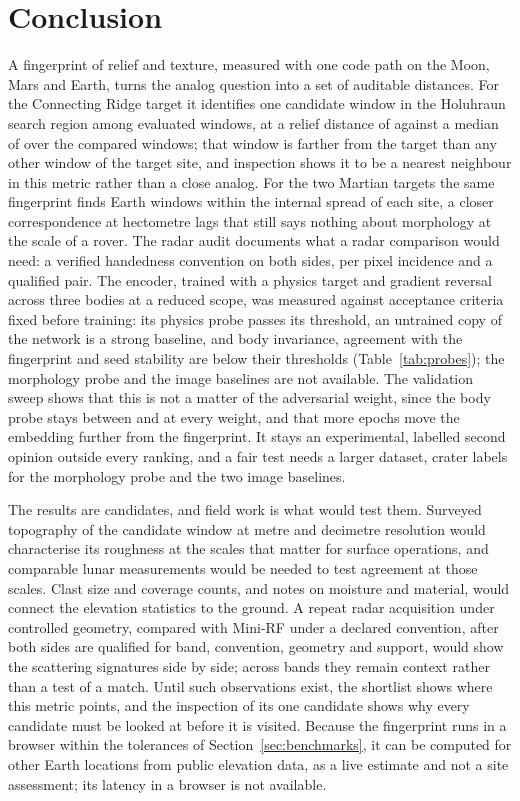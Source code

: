 \section{Conclusion}
\label{sec:conclusion}

A fingerprint of relief and texture, measured with one code path on the Moon, Mars and Earth, turns
the analog question into a set of auditable distances. For the Connecting Ridge target it identifies one candidate window in the Holuhraun search region among \ComparedCount{} evaluated windows, at a relief
distance of \BestReliefDistance{} against a median of \ReliefDistanceMedian{} over the compared
windows; that window is farther from the target than any other window of the target site, and
inspection shows it to be a nearest neighbour in this metric rather than a close analog. For the two Martian targets the same fingerprint finds Earth windows within the internal spread of each site, a closer correspondence at hectometre lags that still says nothing about morphology at the scale of a rover. The radar audit documents what a radar comparison would
need: a verified handedness convention on both sides, per pixel incidence and a qualified pair.
The encoder, trained with a physics target and gradient reversal across three bodies at a reduced scope, was measured against acceptance criteria fixed before training: its physics probe passes its threshold, an untrained copy of the network is a strong baseline, and body invariance, agreement with the fingerprint and seed stability are below their thresholds (Table~\ref{tab:probes}); the morphology probe and the image baselines are not available. The validation sweep shows that this is not a matter of the adversarial weight, since the body probe stays between \ValFortyCBody{} and \ValLamZeroSBody{} at every weight, and that more epochs move the embedding further from the fingerprint. It stays an experimental, labelled second opinion outside every ranking, and a fair test needs a larger dataset, crater labels for the morphology probe and the two image baselines.

The results are candidates, and field work is what would test them. Surveyed topography of the
candidate window at metre and decimetre resolution would characterise its roughness at the scales that matter for surface operations, and comparable lunar measurements would be needed to test agreement at those scales. Clast size and coverage counts, and
notes on moisture and material, would connect the elevation statistics to the ground. A repeat
radar acquisition under controlled geometry, compared with Mini-RF under a declared convention,
after both sides are qualified for band, convention, geometry and support, would show the scattering signatures side by side; across bands they remain context rather than a test of a match. Until such observations exist, the shortlist shows where this metric points, and the inspection of its one candidate shows why every candidate must be looked at before it is visited. Because the fingerprint runs in a browser within the tolerances of Section~\ref{sec:benchmarks}, it can be computed for other Earth locations from public elevation data, as a live estimate and not a site assessment; its latency in a browser is not available.

